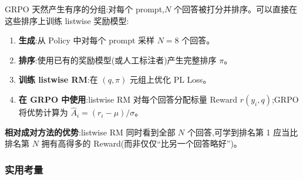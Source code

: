 \begin{keybox}[与 GRPO 的集成]
GRPO 天然产生有序的分组:对每个 prompt,$N$ 个回答被打分并排序。可以直接在这些排序上训练 listwise 奖励模型:

\begin{enumerate}
  \item \textbf{生成}:从 Policy 中对每个 prompt 采样 $N=8$ 个回答。
  \item \textbf{排序}:使用已有的奖励模型(或人工标注者)产生完整排序 $\pi$。
  \item \textbf{训练 listwise RM}:在 $(q, \pi)$ 元组上优化 PL Loss。
  \item \textbf{在 GRPO 中使用}:listwise RM 对每个回答分配标量 Reward $r(y_i, q)$;GRPO 将优势计算为 $\hat{A}_i = (r_i - \mu) / \sigma$。
\end{enumerate}

\textbf{相对成对方法的优势}:listwise RM 同时看到全部 $N$ 个回答,可学到排名第 1 应当比排名第 $N$ 拥有高得多的 Reward(而非仅仅“比另一个回答略好”)。
\end{keybox}

\subsubsection*{实用考量}
\label{practical-considerations}

